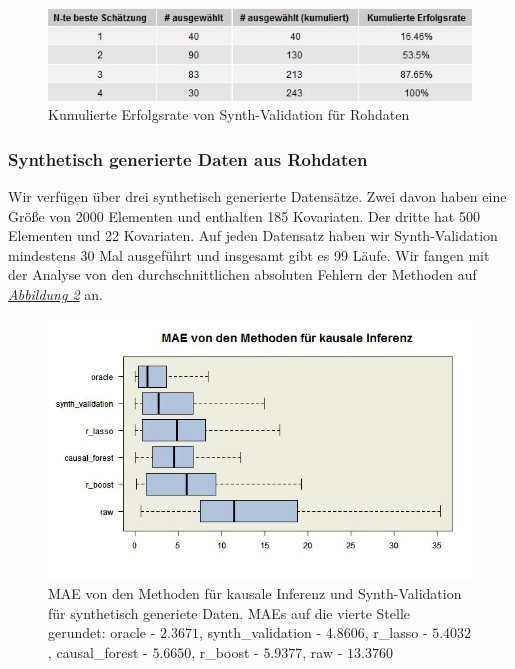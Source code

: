 \documentclass[12pt,a4paper,twoside]{scrartcl}
\numberwithin{equation}{section}
\newcommand{\reffig}[1]{\emph{\hyperref[#1]{Abbildung \ref*{#1}}}}
\begin{document}
\begin{center}
\begin{figure}[h]
    \centering
    \includegraphics[height=0.2\textwidth, width=1\textwidth]{figures/plots/rawDataGrid.jpeg}
    \vspace{1mm}
    \caption[Kumulierte Erfolgsrate von Synth-Validation für Rohdaten]{Kumulierte Erfolgsrate von Synth-Validation für Rohdaten}\label{fig:rawDataGrid}
  \end{figure}
\end{center}

\subsubsection{Synthetisch generierte Daten aus Rohdaten}\label{subsubsec:ergebnisseSynthetischGeneriertenDaten}
Wir verfügen über drei synthetisch generierte Datensätze. Zwei davon haben eine Größe von 2000 Elementen und enthalten 185 Kovariaten. Der dritte hat 500 Elementen und 22 Kovariaten. Auf jeden Datensatz haben wir Synth-Validation mindestens 30 Mal ausgeführt und insgesamt gibt es 99 Läufe. Wir fangen mit der Analyse von den durchschnittlichen absoluten Fehlern der Methoden auf \reffig{fig:generatedDataBoxplot} an.\par

\begin{center}
\begin{figure}[h]
    \centering
    \includegraphics[height=0.5\textwidth, width=1\textwidth]{figures/plots/generatedDataBoxplot.jpeg}
    \caption[MAE von den Methoden für kausale Inferenz und Synth-Validation für synthetisch generiete Daten]{MAE von den Methoden für kausale Inferenz und Synth-Validation für synthetisch generiete Daten. MAEs auf die vierte Stelle gerundet: oracle - $2.3671$, synth\_validation - $4.8606$, r\_lasso - $5.4032$, causal\_forest - $5.6650$, r\_boost - $5.9377$, raw - $13.3760$}\label{fig:generatedDataBoxplot}
  \end{figure}
\end{center}
\end{document}
